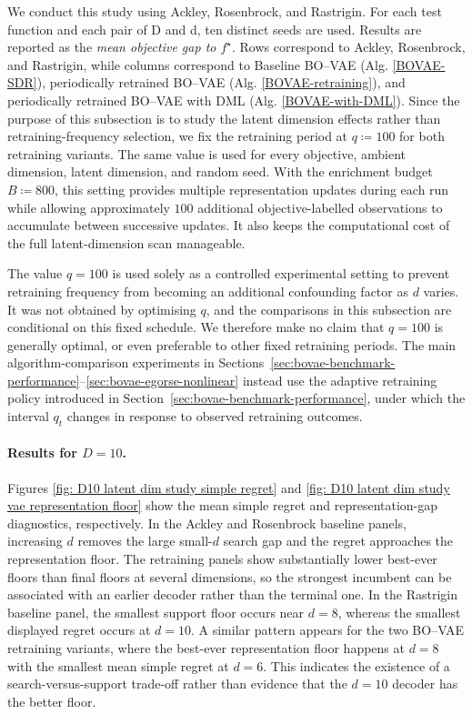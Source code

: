 \documentclass[pdflatex,sn-mathphys-num]{sn-jnl}%
\theoremstyle{thmstyleone}%
\theoremstyle{thmstyletwo}%
\theoremstyle{thmstylethree}%
\begin{document}
We conduct this study using Ackley, Rosenbrock, and Rastrigin. For each test function and each pair of D and d, ten distinct seeds are used. Results are reported as the \emph{mean objective gap to $f^{\star}$}. Rows correspond to Ackley, Rosenbrock, and Rastrigin, while columns correspond to Baseline BO--VAE (Alg. \ref{BOVAE-SDR}), periodically retrained BO--VAE (Alg. \ref{BOVAE-retraining}), and periodically retrained BO--VAE with DML (Alg. \ref{BOVAE-with-DML}). Since the purpose of this subsection is to study the latent dimension effects rather than retraining-frequency selection, we fix the retraining period at $q\coloneq100$ for both retraining variants. The same value is used for every objective, ambient dimension, latent dimension, and random seed. With the enrichment budget \(B\coloneq800\), this setting provides multiple representation updates during each run while allowing approximately \(100\) additional objective-labelled observations to accumulate between successive updates. It also keeps the computational cost of the full latent-dimension scan manageable.

The value \(q=100\) is used solely as a controlled experimental setting to prevent retraining frequency from becoming an additional confounding factor as \(d\) varies. It was not obtained by optimising \(q\), and the comparisons in this subsection are conditional on this fixed schedule. We therefore make no claim that \(q=100\) is generally optimal, or even preferable to other fixed retraining periods. The main algorithm-comparison experiments in Sections~\ref{sec:bovae-benchmark-performance}--\ref{sec:bovae-egorse-nonlinear} instead use the adaptive retraining policy introduced in Section~\ref{sec:bovae-benchmark-performance}, under which the interval \(q_t\) changes in response to observed retraining outcomes. 

\paragraph{Results for \texorpdfstring{$D=10$}{}.} Figures \ref{fig: D10 latent dim study simple regret} and \ref{fig: D10 latent dim study vae representation floor} show the mean simple regret and representation-gap diagnostics, respectively. In the Ackley and Rosenbrock baseline panels, increasing $d$ removes the large small-$d$ search gap and the regret approaches the representation floor.  The retraining panels show substantially lower best-ever floors than final floors at several dimensions, so the strongest incumbent can be associated with an earlier decoder rather than the terminal one.  In the Rastrigin baseline panel, the smallest support floor occurs near $d=8$, whereas the smallest displayed regret occurs at $d=10$. A similar pattern appears for the two BO--VAE retraining variants, where the best-ever representation floor happens at $d = 8$ with the smallest mean simple regret at $d = 6$. This indicates the existence of a search-versus-support trade-off rather than evidence that the $d=10$ decoder has the better floor.
\end{document}
